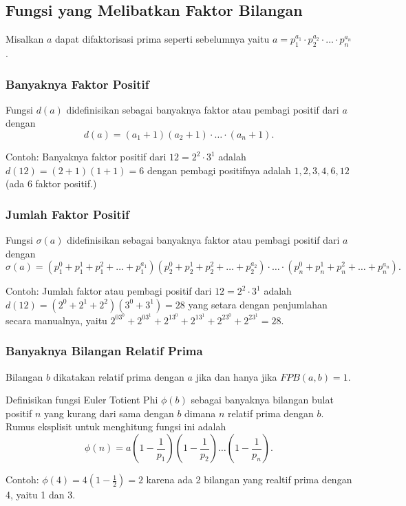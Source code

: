 \documentclass[11pt]{scrartcl}
\begin{document}
        \subsection{Fungsi yang Melibatkan Faktor Bilangan}
        Misalkan $a$ dapat difaktorisasi prima seperti sebelumnya yaitu $a=p_1^{a_1}\cdot p_2^{a_2}\cdot \ldots \cdot p_n^{a_n}$.
        \subsubsection{Banyaknya Faktor Positif}
        Fungsi $d(a)$ didefinisikan sebagai banyaknya faktor atau pembagi positif dari $a$ dengan
        $$d(a) = (a_1+1)(a_2+1)\cdot \ldots \cdot (a_n+1).$$
        
        Contoh: Banyaknya faktor positif dari $12= 2^2 \cdot 3^1$ adalah $d(12)=(2+1)(1+1)=6$ dengan pembagi positifnya adalah $1,2,3,4,6,12$ (ada 6 faktor positif.)
        
        \subsubsection{Jumlah Faktor Positif}
        Fungsi $\sigma (a)$ didefinisikan sebagai banyaknya faktor atau pembagi positif dari $a$ dengan
        $$\sigma (a) = (p_1^0+p_1^1+p_1^2+\dots+p_1^{a_1})(p_2^0+p_2^1+p_2^2+\dots+p_2^{a_2})\cdot \ldots \cdot (p_n^0+p_n^1+p_n^2+\dots+p_n^{a_n}).$$
        
        Contoh: Jumlah faktor atau pembagi positif dari $12= 2^2 \cdot 3^1$ adalah $d(12)=(2^0+2^1+2^2)(3^0+3^1)=28$ yang setara dengan penjumlahan secara manualnya, yaitu $2^03^0+2^03^1+2^13^0+2^13^1+2^23^0+2^23^1=28.$
        
        \subsubsection{Banyaknya Bilangan Relatif Prima}
        \begin{remark*}
        	     Bilangan $b$ dikatakan relatif prima dengan $a$ jika dan hanya jika $FPB(a,b)=1$.
        	\end{remark*}
         Definisikan fungsi Euler Totient Phi $\phi(b)$ sebagai banyaknya bilangan bulat positif $n$ yang kurang dari sama dengan $b$ dimana $n$ relatif prima dengan $b$. Rumus eksplisit untuk menghitung fungsi ini adalah
        $$\phi(n) = a\left(1-\dfrac{1}{p_1}\right)\left(1-\dfrac{1}{p_2}\right)\dots\left(1-\dfrac{1}{p_n}\right).$$
        
        Contoh: $\phi(4)=4(1-\frac{1}{2})=2$ karena ada 2 bilangan yang realtif prima dengan 4, yaitu 1 dan 3.
        
\end{document}
